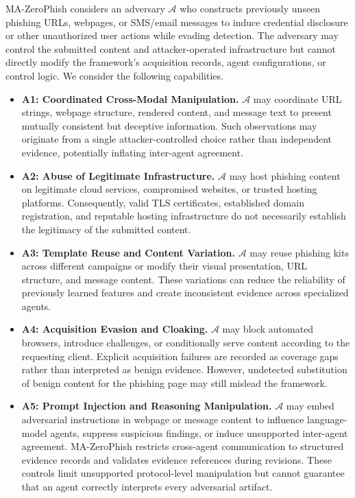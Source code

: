 MA-ZeroPhish considers an adversary
$\mathcal A$ who constructs previously unseen
phishing URLs, webpages, or SMS/email messages
to induce credential disclosure or other
unauthorized user actions while evading
detection. The adversary may control the
submitted content and attacker-operated
infrastructure but cannot directly modify
the framework's acquisition records,
agent configurations, or control logic.
We consider the following capabilities.

\begin{itemize}

\item \textbf{A1: Coordinated Cross-Modal
Manipulation.}
$\mathcal A$ may coordinate URL strings,
webpage structure, rendered content, and
message text to present mutually consistent
but deceptive information. Such observations
may originate from a single attacker-controlled
choice rather than independent evidence,
potentially inflating inter-agent agreement.

\item \textbf{A2: Abuse of Legitimate
Infrastructure.}
$\mathcal A$ may host phishing content on
legitimate cloud services, compromised
websites, or trusted hosting platforms.
Consequently, valid TLS certificates,
established domain registration, and
reputable hosting infrastructure do not
necessarily establish the legitimacy of
the submitted content.

\item \textbf{A3: Template Reuse and
Content Variation.}
$\mathcal A$ may reuse phishing kits across
different campaigns or modify their visual
presentation, URL structure, and message
content. These variations can reduce the
reliability of previously learned features
and create inconsistent evidence across
specialized agents.

\item \textbf{A4: Acquisition Evasion
and Cloaking.}
$\mathcal A$ may block automated browsers,
introduce challenges, or conditionally
serve content according to the requesting
client. Explicit acquisition failures
are recorded as coverage gaps rather than
interpreted as benign evidence. However,
undetected substitution of benign content
for the phishing page may still mislead
the framework.

\item \textbf{A5: Prompt Injection
and Reasoning Manipulation.}
$\mathcal A$ may embed adversarial
instructions in webpage or message content
to influence language-model agents,
suppress suspicious findings, or induce
unsupported inter-agent agreement.
MA-ZeroPhish restricts cross-agent
communication to structured evidence
records and validates evidence references
during revisions. These controls limit
unsupported protocol-level manipulation
but cannot guarantee that an agent
correctly interprets every adversarial
artifact.

\end{itemize}

